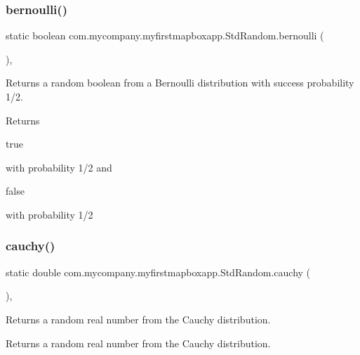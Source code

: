 \subsubsection{\texorpdfstring{bernoulli()}{bernoulli()}\hspace{0.1cm}{\footnotesize\ttfamily [2/2]}}
{\footnotesize\ttfamily static boolean com.\+mycompany.\+myfirstmapboxapp.\+Std\+Random.\+bernoulli (\begin{DoxyParamCaption}{ }\end{DoxyParamCaption})\hspace{0.3cm}{\ttfamily [inline]}, {\ttfamily [static]}}

Returns a random boolean from a Bernoulli distribution with success probability 1/2.

\begin{DoxyReturn}{Returns}

\begin{DoxyCode}
\textcolor{keyword}{true} 
\end{DoxyCode}
 with probability 1/2 and 
\begin{DoxyCode}
\textcolor{keyword}{false} 
\end{DoxyCode}
 with probability 1/2 
\end{DoxyReturn}
\mbox{\label{classcom_1_1mycompany_1_1myfirstmapboxapp_1_1_std_random_ac03102b47e3262aba0a865aad089bb73}} 
\subsubsection{\texorpdfstring{cauchy()}{cauchy()}}
{\footnotesize\ttfamily static double com.\+mycompany.\+myfirstmapboxapp.\+Std\+Random.\+cauchy (\begin{DoxyParamCaption}{ }\end{DoxyParamCaption})\hspace{0.3cm}{\ttfamily [inline]}, {\ttfamily [static]}}

Returns a random real number from the Cauchy distribution.

\begin{DoxyReturn}{Returns}
a random real number from the Cauchy distribution. 
\end{DoxyReturn}
\mbox{\label{classcom_1_1mycompany_1_1myfirstmapboxapp_1_1_std_random_a075bad8a6c834d2ea39ee56feffcdd67}} 
